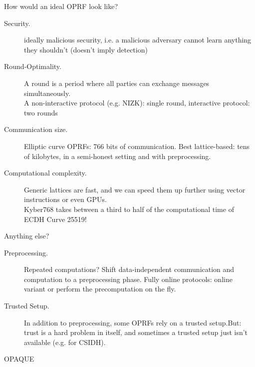 \documentclass[10pt]{beamer}
\begin{document}
  \begin{frame}{How would an ideal OPRF look like?}
    \begin{description}
      \item[Security.] ideally malicious security, i.e. a malicious adversary cannot
        learn anything they shouldn't \pause (doesn't imply detection)\pause
      \item[Round-Optimality.] A \alert{round} is a period where all parties can
        exchange messages simultaneously. \\ \pause A non-interactive protocol (e.g.  NIZK):
        single round, interactive protocol: two rounds \pause
      \item[Communication size.] Elliptic curve OPRFs: 766
        bits of communication. Best lattice-based: tens of kilobytes, in
        a semi-honest setting and with preprocessing.\pause
      \item[Computational complexity.] Generic lattices are fast, and we can speed them up
        further using vector instructions or even GPUs. \\\pause
        Kyber768 takes between a third to half of the
        computational time of ECDH Curve 25519!
    \end{description}
  \end{frame}
  \begin{frame}{Anything else?}
    \begin{description}
      \item[Preprocessing.]  Repeated
        computations? Shift data-independent communication and computation to a
        preprocessing phase.  \pause Fully online protocols: online variant or
        perform the precomputation on the fly.\pause
      \item[Trusted Setup.] In addition to preprocessing, some OPRFs rely on a
        trusted setup.\pause But: trust is a hard problem in itself,
        and sometimes a trusted setup just isn't available (e.g. for
        CSIDH).
    \end{description}
  \end{frame}
 

  \begin{frame}{OPAQUE}
    \hspace{-10em}
  \end{frame}
  
\end{document}
